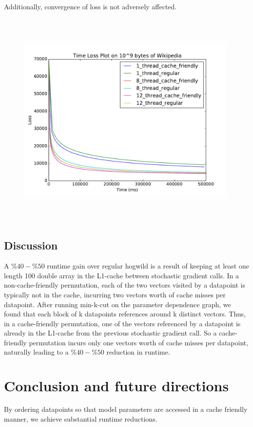 \documentclass[times,11pt]{article}
\numberwithin{equation}{section}		%
\numberwithin{figure}{section}			%
\numberwithin{table}{section}				%
\begin{document}
\noindent Additionally, convergence of loss is not adversely affected.
\begin{figure}[H]
\begin{center}
\includegraphics[width=11cm,height=11cm,keepaspectratio]{w2v_time_loss_plot.pdf}
\end{center}
\end{figure}

\subsection{Discussion}

A $\%40-\%50$ runtime gain over regular hogwild is a result of keeping
at least one length 100 double array in the L1-cache between
stochastic gradient calls. In a non-cache-friendly permutation, each
of the two vectors visited by a datapoint is typically not in the
cache, incurring two vectors worth of cache misses per
datapoint. After running min-k-cut on the parameter dependence graph,
we found that each block of k datapoints references around k distinct
vectors. Thus, in a cache-friendly permutation, one of the vectors
referenced by a datapoint is already in the L1-cache from the previous
stochastic gradient call. So a cache-friendly permutation incurs only
one vectors worth of cache misses per datapoint, naturally leading to
a $\%40-\%50$ reduction in runtime.
\newpage

\section{Conclusion and future directions}\label{sec:conc}
By ordering datapoints so that model parameters are accessed in a cache friendly manner, we achieve substantial runtime reductions.
\end{document}
